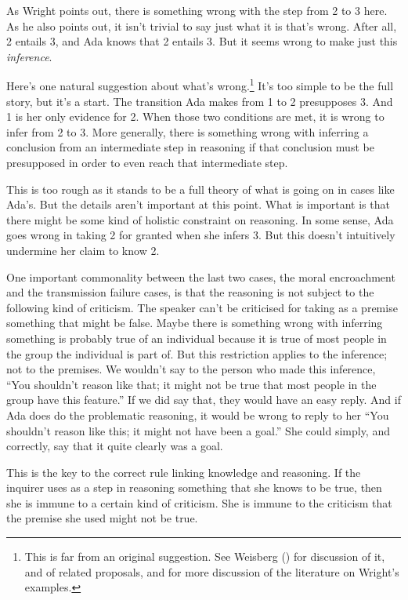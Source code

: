 \documentclass[
  12pt,
  letterpaper,
]{scrbook}
\begin{document}
As Wright points out, there is something wrong with the step from 2 to 3
here. As he also points out, it isn't trivial to say just what it is
that's wrong. After all, 2 entails 3, and Ada knows that 2 entails 3.
But it seems wrong to make just this \emph{inference}.

Here's one natural suggestion about what's wrong.\footnote{This is far
  from an original suggestion. See Weisberg
  () for discussion of it, and of
  related proposals, and for more discussion of the literature on
  Wright's examples.} It's too simple to be the full story, but it's a
start. The transition Ada makes from 1 to 2 presupposes 3. And 1 is her
only evidence for 2. When those two conditions are met, it is wrong to
infer from 2 to 3. More generally, there is something wrong with
inferring a conclusion from an intermediate step in reasoning if that
conclusion must be presupposed in order to even reach that intermediate
step.

This is too rough as it stands to be a full theory of what is going on
in cases like Ada's. But the details aren't important at this point.
What is important is that there might be some kind of holistic
constraint on reasoning. In some sense, Ada goes wrong in taking 2 for
granted when she infers 3. But this doesn't intuitively undermine her
claim to know 2.

One important commonality between the last two cases, the moral
encroachment and the transmission failure cases, is that the reasoning
is not subject to the following kind of criticism. The speaker can't be
criticised for taking as a premise something that might be false. Maybe
there is something wrong with inferring something is probably true of an
individual because it is true of most people in the group the individual
is part of. But this restriction applies to the inference; not to the
premises. We wouldn't say to the person who made this inference, ``You
shouldn't reason like that; it might not be true that most people in the
group have this feature.'' If we did say that, they would have an easy
reply. And if Ada does do the problematic reasoning, it would be wrong
to reply to her ``You shouldn't reason like this; it might not have been
a goal.'' She could simply, and correctly, say that it quite clearly was
a goal.

This is the key to the correct rule linking knowledge and reasoning. If
the inquirer uses as a step in reasoning something that she knows to be
true, then she is immune to a certain kind of criticism. She is immune
to the criticism that the premise she used might not be true.
\end{document}
